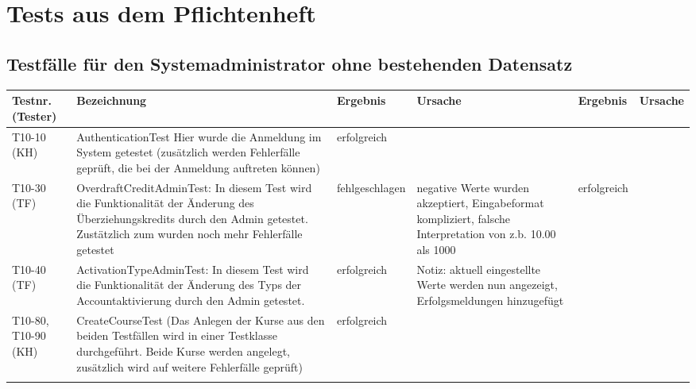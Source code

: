 \chapter{Tests aus dem Pflichtenheft}

\begin{landscape}
	\section{Testfälle für den Systemadministrator ohne bestehenden Datensatz}	
		\begin{tabular}{|p{2.0cm} |p{5.0cm}|p{3.0cm}|p{5.0cm}|p{4.0cm}|p{4.0cm}|}
			\hline \textbf{Testnr. (Tester)} & \textbf{Bezeichnung} & \textbf{Ergebnis} & \textbf{Ursache} & \textbf{Ergebnis} & \textbf{Ursache} \\ 
      	    \hline    T10-10 (KH)   &      AuthenticationTest Hier wurde die Anmeldung im System getestet (zusätzlich werden Fehlerfälle geprüft, die bei der Anmeldung auftreten können)   &  erfolgreich &                  &                   &                  \\ 
      	    
      	     \hline    T10-30 (TF)  &    OverdraftCreditAdminTest: In diesem Test wird die Funktionalität der Änderung des Überziehungskredits durch den Admin getestet.
      	                             Zustätzlich zum wurden noch mehr Fehlerfälle getestet   &  fehlgeschlagen &    negative Werte wurden akzeptiert, Eingabeformat kompliziert, falsche Interpretation von z.b. 10.00 als 1000              &      erfolgreich             &                  \\ 
      	                             
      	    \hline    T10-40 (TF)   &    ActivationTypeAdminTest: In diesem Test wird die Funktionalität der Änderung des Typs der Accountaktivierung durch den Admin getestet.
      	      &  erfolgreich &  Notiz: aktuell eingestellte Werte werden nun angezeigt, Erfolgsmeldungen hinzugefügt           &                &                  \\                          
      	                             
			
			\hline T10-80, T10-90 (KH)   &      CreateCourseTest  (Das Anlegen der Kurse aus den beiden Testfällen wird in einer Testklasse durchgeführt. Beide Kurse werden angelegt, zusätzlich wird auf weitere Fehlerfälle geprüft)              &      erfolgreich             &                  &                   &                  \\ 
			\hline       &          &          &        &         &       \\
			\hline 
		\end{tabular} \ \\
		\ \\

\end{landscape}
